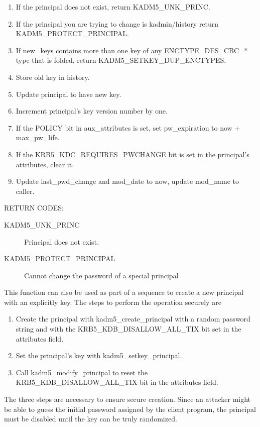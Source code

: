\begin{enumerate}
\item If the principal does not exist, return KADM5_UNK_PRINC.
\item If the principal you are trying to change is kadmin/history return
KADM5_PROTECT_PRINCIPAL.
\item If new_keys contains more than one key of any ENCTYPE_DES_CBC_*
type that is folded, return KADM5_SETKEY_DUP_ENCTYPES.
\item Store old key in history.
\item Update principal to have new key.
\item Increment principal's key version number by one.
\item If the POLICY bit in aux_attributes is set, set pw_expiration to
now + max_pw_life.
\item If the KRB5_KDC_REQUIRES_PWCHANGE bit is set in the principal's
attributes, clear it.
\item Update last_pwd_change and mod_date to now, update mod_name to
caller.
\end{enumerate}

RETURN CODES:

\begin{description}
\item[KADM5_UNK_PRINC] Principal does not exist.
\item[KADM5_PROTECT_PRINCIPAL] Cannot change the password of a special
principal
\end{description}

This function can also be used as part of a sequence to create a new
principal with an explicitly key.  The steps to perform the operation
securely are

\begin{enumerate}
\item Create the principal with kadm5_create_principal with a
random password string and with the KRB5_KDB_DISALLOW_ALL_TIX bit set
in the attributes field.

\item Set the principal's key with kadm5_setkey_principal.

\item Call kadm5_modify_principal to reset the
KRB5_KDB_DISALLOW_ALL_TIX bit in the attributes field.
\end{enumerate}

The three steps are necessary to ensure secure creation.  Since an
attacker might be able to guess the initial password assigned by the
client program, the principal must be disabled until the key can be
truly randomized.

